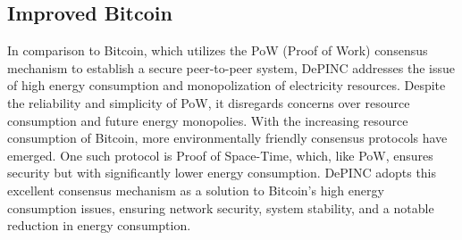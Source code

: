 \subsection{Improved Bitcoin}
\begin{flushleft}
    In comparison to Bitcoin, which utilizes the PoW (Proof of Work) consensus mechanism to establish a secure peer-to-peer system, DePINC addresses the issue of high energy consumption and monopolization of electricity resources. Despite the reliability and simplicity of PoW, it disregards concerns over resource consumption and future energy monopolies. With the increasing resource consumption of Bitcoin, more environmentally friendly consensus protocols have emerged. One such protocol is Proof of Space-Time, which, like PoW, ensures security but with significantly lower energy consumption. DePINC adopts this excellent consensus mechanism as a solution to Bitcoin's high energy consumption issues, ensuring network security, system stability, and a notable reduction in energy consumption.
\end{flushleft}
